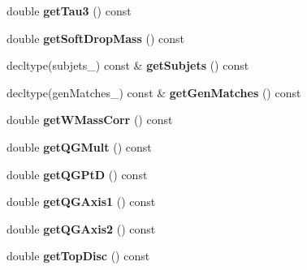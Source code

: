\begin{DoxyCompactItemize}
\item 
\hypertarget{classConstituent_ac33bc6f45eca6ce4fc6f5cef83159156}{double {\bfseries get\-Tau3} () const }\label{classConstituent_ac33bc6f45eca6ce4fc6f5cef83159156}

\item 
\hypertarget{classConstituent_a0aa688482470252d075d07e9467e21c0}{double {\bfseries get\-Soft\-Drop\-Mass} () const }\label{classConstituent_a0aa688482470252d075d07e9467e21c0}

\item 
\hypertarget{classConstituent_a07f258d8045b1dc37fecf10b44448ba4}{decltype(subjets\-\_\-) const \& {\bfseries get\-Subjets} () const }\label{classConstituent_a07f258d8045b1dc37fecf10b44448ba4}

\item 
\hypertarget{classConstituent_a228e250e72e942fdea1681b410f4678d}{decltype(gen\-Matches\-\_\-) const \& {\bfseries get\-Gen\-Matches} () const }\label{classConstituent_a228e250e72e942fdea1681b410f4678d}

\item 
\hypertarget{classConstituent_a01bc43e8507edb0dd049a0116ce1eb2f}{double {\bfseries get\-W\-Mass\-Corr} () const }\label{classConstituent_a01bc43e8507edb0dd049a0116ce1eb2f}

\item 
\hypertarget{classConstituent_aac16a1b470590029529d1a6b77d50f41}{double {\bfseries get\-Q\-G\-Mult} () const }\label{classConstituent_aac16a1b470590029529d1a6b77d50f41}

\item 
\hypertarget{classConstituent_a088fc8a7a9324cd7568c47d96a3d08db}{double {\bfseries get\-Q\-G\-Pt\-D} () const }\label{classConstituent_a088fc8a7a9324cd7568c47d96a3d08db}

\item 
\hypertarget{classConstituent_a6120efae2154ff7167e70e32a260fed8}{double {\bfseries get\-Q\-G\-Axis1} () const }\label{classConstituent_a6120efae2154ff7167e70e32a260fed8}

\item 
\hypertarget{classConstituent_a26c8c9244eda89d85a0441bf71a7e21e}{double {\bfseries get\-Q\-G\-Axis2} () const }\label{classConstituent_a26c8c9244eda89d85a0441bf71a7e21e}

\item 
\hypertarget{classConstituent_a5e6d49f8b60711586aed4506a07b538c}{double {\bfseries get\-Top\-Disc} () const }\label{classConstituent_a5e6d49f8b60711586aed4506a07b538c}


\end{DoxyCompactItemize}
